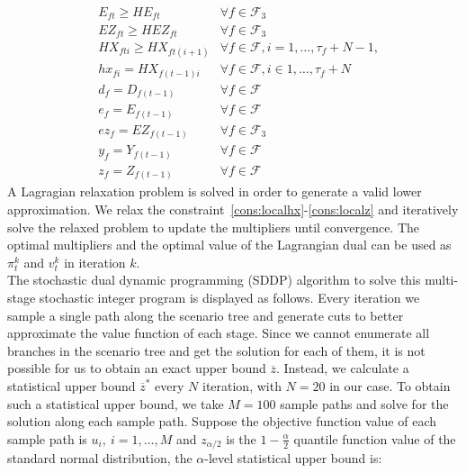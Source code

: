 \documentclass[12pt]{article}
\begin{document}
\begin{subequations}
\begin{align}
			& E_{ft} \geq HE_{ft} & \forall f \in \mathcal{F}_3 \label{cons:transEtr}\\
			& EZ_{ft} \geq HEZ_{ft} & \forall f \in \mathcal{F}_3 \label{cons:transEZtr}\\
			& HX_{fti} \geq HX_{ft(i+1)} & \forall f \in \mathcal{F}, i = 1, \dots, \tau_{f} + N -1, \label{cons:transHXtr}\\
			& hx_{fi} = HX_{f(t-1)i}& \forall f \in \mathcal{F}, i \in 1, \dots, \tau_{f} + N \label{cons:localhx} \\
			& d_{f} = D_{f(t-1)} & \forall f \in \mathcal{F} \label{cons:locald}\\
			& e_{f} = E_{f(t-1)} & \forall f \in \mathcal{F} \label{cons:locale}\\
			& ez_{f} = EZ_{f(t-1)} & \forall f \in \mathcal{F}_3 \label{cons:localez}\\
			& y_{f} = Y_{f(t-1)} & \forall f \in \mathcal{F} \label{cons:localy}\\
			& z_{f} = Z_{f(t-1)} & \forall f \in \mathcal{F} \label{cons:localz}
		\end{align}
	\end{subequations}
	A Lagragian relaxation problem is solved in order to generate a valid lower approximation. We relax the constraint~\eqref{cons:localhx}-\eqref{cons:localz} and iteratively solve the relaxed problem to update the multipliers until convergence. The optimal multipliers and the optimal value of the Lagrangian dual can be used as \(\pi_t^k\) and \(v_t^k\) in iteration \(k\).\\
	\newline
	The stochastic dual dynamic programming (SDDP) algorithm to solve this multi-stage stochastic integer program is displayed as follows. Every iteration we sample a single path along the scenario tree and generate cuts to better approximate the value function of each stage. Since we cannot enumerate all branches in the scenario tree and get the solution for each of them, it is not possible for us to obtain an exact upper bound \(\overline{z}\). Instead, we calculate a statistical upper bound \(\overline{z}^*\) every \(N\) iteration, with \(N = 20\) in our case. To obtain such a statistical upper bound, we take \(M = 100\) sample paths and solve for the solution along each sample path. Suppose the objective function value of each sample path is \(u_i,\ i = 1, \dots, M\) and \(z_{\alpha/2}\) is the \(1 - \frac{\alpha}{2}\) quantile function value of the standard normal distribution, the \(\alpha\)-level statistical upper bound is:
\end{document}
